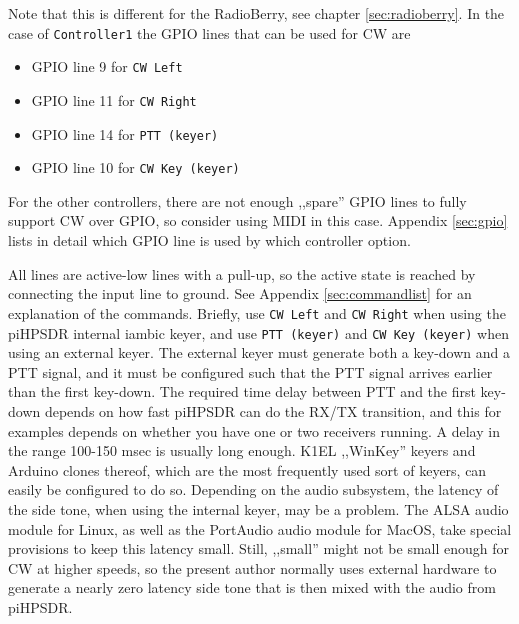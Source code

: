 \documentclass[12pt]{book}
\def\bltt#1{\texttt{\color{blue}#1}}
\def\pH{pi\-HPSDR\xspace}
\begin{document}
Note that this is different for the RadioBerry, see chapter \ref{sec:radioberry}.
In the case of \texttt{Controller1} the GPIO lines that can be used for CW are

\begin{itemize}
\item{GPIO line 9 for \bltt{CW Left}}
\item{GPIO line 11 for \bltt{CW Right}}
\item{GPIO line 14 for \bltt{PTT (keyer)}}
\item{GPIO line 10 for \bltt{CW Key (keyer)}}
\end{itemize}

For the other controllers, there are not enough ,,spare'' GPIO lines to fully
support CW over GPIO, so consider using MIDI in this case.
Appendix \ref{sec:gpio} lists in detail which GPIO line
is used by which controller option.

All lines are active-low lines with a pull-up, so the active state is reached
by connecting the input line to ground. See Appendix \ref{sec:commandlist} for
an explanation of the commands. Briefly, use \bltt{CW Left} and \bltt{CW Right}
when using the \pH internal iambic keyer, and use \bltt{PTT (keyer)} and
\bltt{CW Key (keyer)} when using an external keyer.
The external keyer must generate both a key-down and a PTT signal, and it must be configured
such that the PTT signal arrives earlier than the first key-down. The required time
delay between PTT and the first key-down depends  on how fast \pH can do the
RX/TX transition, and this for examples depends on whether you have one or two receivers
running. A delay in the range 100-150 msec is usually long enough.
K1EL ,,WinKey'' keyers and Arduino clones thereof, which are the most frequently
used sort
of keyers, can easily be configured to do so. Depending on the audio subsystem,
the latency of the side tone, when using the internal keyer, may be a problem.
The ALSA audio module for Linux, as well as the PortAudio audio  module for MacOS,
 take special provisions to keep this latency small. Still, ,,small'' might not
 be small enough for CW at higher speeds, so the present author normally uses
 external hardware to generate a nearly zero latency side tone that is then
 mixed with the audio from \pH.
\end{document}
